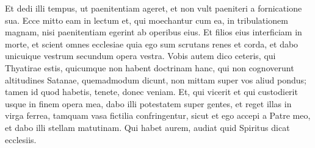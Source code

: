 \begin{biblechapter}
\begin{biblechapter}
\verse Et dedi illi tempus, ut paenitentiam ageret, et non vult paeniteri a fornicatione sua. 
\verse Ecce mitto eam in lectum et, qui moechantur cum ea, in tribulationem magnam, nisi paenitentiam egerint ab operibus eius. 
\verse Et filios eius interficiam in morte, et scient omnes ecclesiae quia ego sum scrutans renes et corda, et dabo unicuique vestrum secundum opera vestra. 
\verse Vobis autem dico ceteris, qui Thyatirae estis, quicumque non habent doctrinam hanc, qui non cognoverunt altitudines Satanae, quemadmodum dicunt, non mittam super vos aliud pondus; 
\verse tamen id quod habetis, tenete, donec veniam. 
\verse Et, qui vicerit et qui custodierit usque in finem opera mea, dabo illi potestatem super gentes,
 \verse et reget illas in virga ferrea,
 tamquam vasa fictilia confringentur,
 \verse sicut et ego accepi a Patre meo, et dabo illi stellam matutinam.
 \verse Qui habet aurem, audiat quid Spiritus dicat ecclesiis.
 

\end{biblechapter}
\end{biblechapter}
